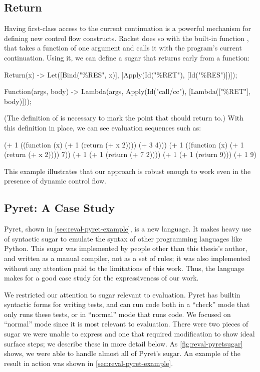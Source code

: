 \subsection{Return}
  Having first-class access to the current continuation is a powerful
  mechanism for defining new control flow constructs. Racket does so with
  the built-in function , that takes a function of one
  argument and calls it with the program's current continuation. Using it,
  we can define a  sugar that returns early from a function:
  \begin{Codes}
  Return(x) ->
    Let([Bind("\%RES", x)],
        [Apply(Id("\%RET"), [Id("\%RES")])]);

  Function(args, body) ->
    Lambda(args, Apply(Id("call/cc"),
                       [Lambda(["\%RET"], body)]));
  \end{Codes}
  (The definition of  is necessary to mark the point that
   should return to.) With this definition in place, we can
  see evaluation sequences such as:
  \begin{Codes}
    (+ 1 ((function (x) (+ 1 (return (+ x 2)))) (+ 3 4)))
\SurfStep (+ 1 ((function (x) (+ 1 (return (+ x 2)))) 7))
\SurfStep (+ 1 (+ 1 (return (+ 7 2))))
\SurfStep (+ 1 (+ 1 (return 9)))
\SurfStep (+ 1 9)
  \end{Codes}
  This example illustrates that our approach is robust enough to work even
  in the presence of dynamic control flow.


\subsection{Pyret: A Case Study}
\label{sec:reval-pyret}

Pyret, shown in \cref{sec:reval-pyret-example}, is a new language. It makes
heavy use of syntactic sugar to emulate the syntax of other programming
languages like Python. This sugar was implemented by people other than
this thesis's author, and written as a manual compiler, not as a set
of rules; it was also implemented without any attention paid to the
limitations of this work. Thus, the language makes for a good case
study for the expressiveness of our work.

We restricted our attention to sugar relevant to evaluation. Pyret has
builtin syntactic forms for writing tests, and can run code both in a
``check'' mode that only runs these tests, or in ``normal'' mode that runs
code. We focused on ``normal'' mode since it is most
relevant to evaluation. There were two pieces of sugar we
were unable to express and one that
required modification to show ideal surface steps; we
describe these in more detail below. 
As \cref{fig:reval-pyretsugar} shows, we were able to handle almost all
of Pyret's sugar. An example of the result in action was shown in
\cref{sec:reval-pyret-example}.

